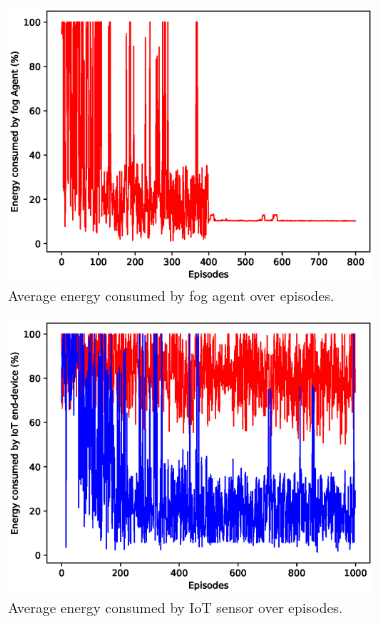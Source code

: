 \documentclass[journal]{IEEEtran}
\begin{document}
\begin{figure}[!t]
\centering
\includegraphics[width=3.8in]{energy_fog.eps}
\caption{Average energy consumed by fog agent over episodes.}
\label{energy_fog}
\end{figure}

\begin{figure}[!t]
\centering
\includegraphics[width=3.8in]{energy_iot.eps}
\caption{Average energy consumed by IoT sensor over episodes.}
\label{energy_iot}
\end{figure}
\end{document}
